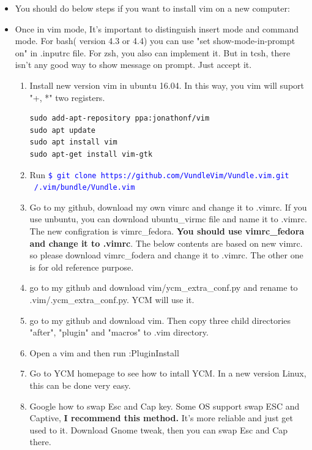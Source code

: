 \documentclass[a4paper,11pt,twoside]{book}
\newcommand{\linuxcommand}[1]{\texttt{\textcolor{blue}{\$ #1 \Pisymbol{psy}{191}}}}
\begin{document}
\begin{itemize}

    \item You should do below steps if you want to install vim on a new computer:
		
    \item Once in vim mode, It's important to distinguish insert mode and command mode. For bash( version 4.3 or 4.4) you can use  "set show-mode-in-prompt on" in .inputrc file. For zsh, you also can implement it. But in tcsh, there isn't any good way to show message on prompt. Just accept it.   

\begin{enumerate}

	\item Install new version vim in ubuntu 16.04. In this way, you vim will suport "+, *" two registers. 
\begin{verbatim}
sudo add-apt-repository ppa:jonathonf/vim
sudo apt update
sudo apt install vim
sudo apt-get install vim-gtk
\end{verbatim}

		\item Run \linuxcommand{git clone https://github.com/VundleVim/Vundle.vim.git ~/.vim/bundle/Vundle.vim}

		\item Go to my github, download my own vimrc and change it to .vimrc. If you use unbuntu, you can download ubuntu\_virmc file and name it to .vimrc. The new configration is vimrc\_fedora. \textbf{You should use vimrc\_fedora and change it to .vimrc}.  The below contents are based on new vimrc. so please download vimrc\_fodera and change it to .vimrc. The other one is for old reference purpose.
		
		\item go to my github and download vim/ycm\_extra\_conf.py and rename to .vim/.ycm\_extra\_conf.py. YCM will use it. 

		\item go to my github and download vim. Then copy three child directories "after", "plugin" and "macros" to .vim directory.

		\item Open a vim and then run :PluginInstall
		
		\item Go to YCM homepage to see how to intall YCM. In a new version Linux, this can be done very easy.
		
		\item Google how to swap Esc and Cap key. Some OS support swap ESC and Captive, \textbf{I recommend this method.} It's more reliable and just get used to it. Download Gnome tweak, then you can swap Esc and Cap there.


\end{enumerate}
\end{itemize}
\end{document}
